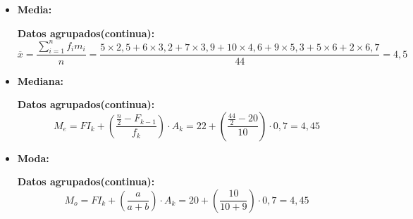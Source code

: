 \documentclass{templateNote}
\begin{document}
\begin{itemize}
    \item \textbf{Media:}
    
    \textbf{Datos agrupados(continua):}
    \begin{equation*}
        \overline{x} = \frac{\displaystyle \sum_{i=1}^{n} f_i m_i}{n} = \frac{5 \times 2,5 + 6 \times 3,2 + 7 \times 3,9 + 10 \times 4,6 + 9 \times 5,3 + 5 \times 6 + 2 \times 6,7}{44} = 4,5
    \end{equation*}

    \item \textbf{Mediana:}
    
    \textbf{Datos agrupados(continua):}
    \begin{equation*}
        M_e = FI_k + \left(\frac{\displaystyle \frac{n}{2} - F_{k-1}}{f_k}\right) \cdot A_k = 22 + \left(\frac{\displaystyle \frac{44}{2} - 20}{10}\right) \cdot 0,7 = 4,45
    \end{equation*}

    \item \textbf{Moda:}
    
    \textbf{Datos agrupados(continua):}
    \begin{equation*}
        M_o = FI_k + \left(\frac{a}{a + b}\right) \cdot A_k = 20 + \left(\frac{10}{10 + 9}\right) \cdot 0,7 = 4,45
    \end{equation*}
\end{itemize}
\end{document}
